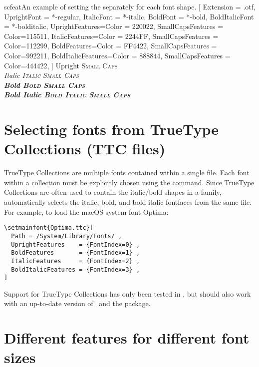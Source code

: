 \begin{Xexample}{scfeat}{An example of setting the 
separately for each font shape.}
  [
      Extension = {.otf},
      UprightFont = {*-regular}, ItalicFont = {*-italic},
      BoldFont = {*-bold}, BoldItalicFont = {*-bolditalic},
      UprightFeatures={Color = 220022,
           SmallCapsFeatures = {Color=115511}},
       ItalicFeatures={Color = 2244FF,
           SmallCapsFeatures = {Color=112299}},
         BoldFeatures={Color = FF4422,
           SmallCapsFeatures = {Color=992211}},
   BoldItalicFeatures={Color = 888844,
           SmallCapsFeatures = {Color=444422}},
           ]
  Upright {\scshape Small Caps}\\
  \itshape Italic {\scshape Italic Small Caps}\\
  \upshape\bfseries Bold {\scshape Bold Small Caps}\\
  \itshape Bold Italic {\scshape Bold Italic Small Caps}
\end{Xexample}


\section{Selecting fonts from TrueType Collections (TTC files)}
TrueType Collections are multiple fonts contained within a single file.
Each font within a collection must be explicitly chosen using the  command.
Since TrueType Collections are often used to contain the italic/bold shapes in a family,  automatically selects the italic, bold, and bold italic fontfaces from the same file.
For example, to load the macOS system font Optima:
\begin{Verbatim}
\setmainfont{Optima.ttc}[
  Path = /System/Library/Fonts/ ,
  UprightFeatures    = {FontIndex=0} ,
  BoldFeatures       = {FontIndex=1} ,
  ItalicFeatures     = {FontIndex=2} ,
  BoldItalicFeatures = {FontIndex=3} ,
]
\end{Verbatim}
Support for TrueType Collections has only been tested in \XeTeX, but should also work with an up-to-date version of \LuaTeX\ and the  package.


\section{Different features for different font sizes}
\label{sec:sizefeature}


